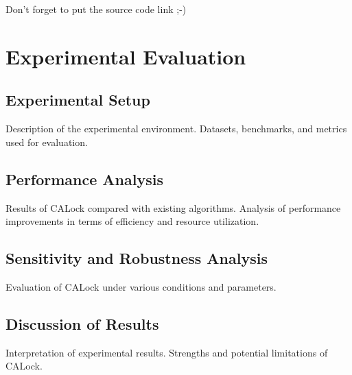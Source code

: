 
Don't forget to put the source code link ;-) 


\chapter{Experimental Evaluation}
\section{Experimental Setup}
Description of the experimental environment. Datasets, benchmarks, and metrics used for evaluation.

\section{Performance Analysis}
Results of CALock compared with existing algorithms. Analysis of performance improvements in terms of efficiency and resource utilization.

\section{Sensitivity and Robustness Analysis}
Evaluation of CALock under various conditions and parameters.

\section{Discussion of Results}
Interpretation of experimental results. Strengths and potential limitations of CALock.

